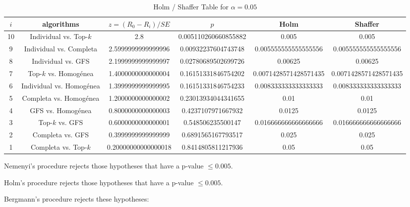\documentclass[a4paper,10pt]{article}
\begin{document}
\begin{landscape}
\begin{table}[!htp]
\centering\tiny
\caption{Holm / Shaffer Table for $\alpha=0.05$}
\begin{tabular}{cccccc}
$i$&algorithms&$z=(R_0 - R_i)/SE$&$p$&Holm&Shaffer\\
\hline
10&Individual vs. Top-$k$&2.8&0.005110260660855882&0.005&0.005\\
9&Individual vs. Completa&2.5999999999999996&0.00932237604743748&0.005555555555555556&0.005555555555555556\\
8&Individual vs. GFS&2.1999999999999997&0.02780689502699726&0.00625&0.00625\\
7&Top-$k$ vs. Homogénea&1.4000000000000004&0.16151331846754202&0.0071428571428571435&0.0071428571428571435\\
6&Individual vs. Homogénea&1.3999999999999995&0.16151331846754233&0.008333333333333333&0.008333333333333333\\
5&Completa vs. Homogénea&1.2000000000000002&0.23013934044341655&0.01&0.01\\
4&GFS vs. Homogénea&0.8000000000000003&0.4237107971667932&0.0125&0.0125\\
3&Top-$k$ vs. GFS&0.6000000000000001&0.548506235500147&0.016666666666666666&0.016666666666666666\\
2&Completa vs. GFS&0.3999999999999999&0.6891565167793517&0.025&0.025\\
1&Completa vs. Top-$k$&0.20000000000000018&0.8414805811217936&0.05&0.05\\
\hline
\end{tabular}
\end{table}
Nemenyi's procedure rejects those hypotheses that have a p-value $\le0.005$.


Holm's procedure rejects those hypotheses that have a p-value $\le0.005$.


Bergmann's procedure rejects these hypotheses:


\begin{itemize}


\end{itemize}



\end{landscape}
\end{document}
